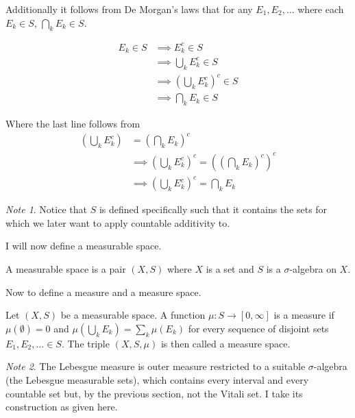 \documentclass[12pt]{article}
\theoremstyle{plain}
\theoremstyle{definition}
\theoremstyle{definition}
\theoremstyle{remark}
\newtheorem*{remark}{Note}
\begin{document}
Additionally it follows from De Morgan's laws that for any $E_1, E_2, \ldots$ 
where each $E_k \in S$, $\bigcap_k E_k \in S$.

\begin{align*}
    E_k \in S &\implies E_k^{c} \in S \\
    &\implies \bigcup_k E_k^{c} \in S \\
    &\implies (\bigcup_k E_k^{c})^{c} \in S \\
    &\implies \bigcap_k E_k \in S
\end{align*}

Where the last line follows from
\begin{align*}
    (\bigcup_k E_k^{c}) &= (\bigcap_k E_k)^{c} \\
    &\implies (\bigcup_k E_k^{c})^{c} = ((\bigcap_k E_k)^{c})^{c} \\
    &\implies (\bigcup_k E_k^{c})^{c} = \bigcap_k E_k
\end{align*}

\begin{remark}
    Notice that $S$ is defined specifically such that it contains the sets for which
    we later want to apply countable additivity to.
\end{remark}


I will now define a measurable space.

\begin{definition}
    A measurable space is a pair $(X, S)$ where $X$ is a set and $S$ is a $\sigma$-algebra
    on $X$.
\end{definition}


Now to define a measure and a measure space.

\begin{definition}
    Let $(X, S)$ be a measurable space. A function $\mu \colon S \to [0, \infty]$ is a
    measure if $\mu(\emptyset) = 0$ and $\mu(\bigcup_k E_k) = \sum_k \mu(E_k)$ for every
    sequence of disjoint sets $E_1, E_2, \ldots \in S$. The triple $(X, S, \mu)$ is then called
    a measure space.
\end{definition}

\begin{remark}
    The Lebesgue measure is outer measure restricted to a suitable $\sigma$-algebra
    (the Lebesgue measurable sets), which contains every interval and every countable set
    but, by the previous section, not the Vitali set. I take its construction as given here.
\end{remark}
\end{document}
